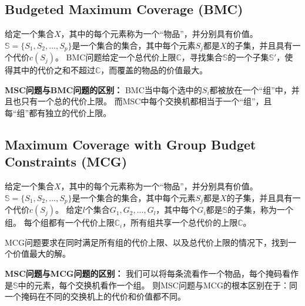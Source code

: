 \subsection{Budgeted Maximum Coverage (BMC)\cite{khuller1999budgeted}}
给定一个集合$X$，其中的每个元素称为一个“物品”，并分别具有价值。
$\mathds{S}=\{S_1,S_2,...,S_p\}$是一个集合的集合，其中每个元素$S_j$都是$X$的子集，并且具有一个代价$c(S_j)$。
BMC问题给定一个总代价上限$\mathds{C} $，寻找集合$\mathds{S}$的一个子集$\mathds{S}'$，使得其中的代价之和不超过$\mathds{C} $，而覆盖的物品的价值最大。

\textbf{MSC问题与BMC问题的区别：} 
BMC当中每个选中的$S_i$都被放在一个“组”中，并且也只有一个总的代价上限。
而MSC中每个交换机都相当于一个“组”，且每“组”都有独立的代价上限。


\subsection{Maximum Coverage with Group Budget Constraints (MCG)\cite{chekuri2004maximum}}\label{def:mcg}
给定一个集合$X$，其中的每个元素称为一个“物品”，并分别具有价值。
$\mathds{S}=\{S_1,S_2,...,S_p\}$是一个集合的集合，其中每个元素$S_j$都是$X$的子集，并且具有一个代价$c(S_j)$。
给定$l$个集合$G_1,G_2,...,G_l$，其中每个$G_i$都是$\mathds{S}$的子集，称为一个组。
每个组都有一个代价上限$\mathds{C}_i$，所有组共享一个总代价的上限$\mathds{C} $。

MCG问题要求在同时满足所有组的代价上限、以及总代价上限的情况下，找到一个价值最大的解。

\textbf{MSC问题与MCG问题的区别：} 
我们可以将每条流看作一个物品，每个掩码看作是$\mathds{S}$中的元素，每个交换机看作一个组。
则MSC问题与MCG的根本区别在于：同一个掩码在不同的交换机上的代价和价值都不同。
